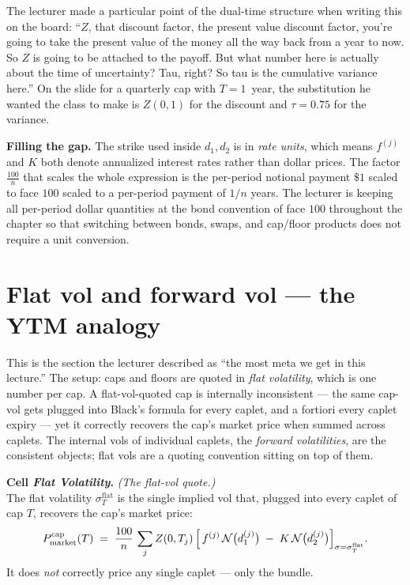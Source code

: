 The lecturer made a particular point of the dual-time structure
when writing this on the board: ``$Z$, that discount factor, the
present value discount factor, you're going to take the present value
of the money all the way back from a year to now. So $Z$ is going to
be attached to the payoff. But what number here is actually about the
time of uncertainty? Tau, right? So tau is the cumulative variance
here.'' On the slide for a quarterly cap with $T = 1$~year, the
substitution he wanted the class to make is $Z(0, 1)$ for the
discount and $\tau = 0.75$ for the variance.

\begin{tipblock}
\textbf{Filling the gap.} The strike used inside $d_1, d_2$ is in
\emph{rate units}, which means $f^{(j)}$ and $K$ both denote
annualized interest rates rather than dollar prices. The factor
$\frac{100}{n}$ that scales the whole expression is the per-period
notional payment $\$1$ scaled to face $100$ scaled to a per-period
payment of $1/n$ years. The lecturer is keeping all per-period dollar
quantities at the bond convention of face $100$ throughout the
chapter so that switching between bonds, swaps, and cap/floor
products does not require a unit conversion.
\end{tipblock}

\section{Flat vol and forward vol --- the YTM analogy}\label{L6-sec:flatvfwd}

This is the section the lecturer described as ``the most meta we get
in this lecture.'' The setup: caps and floors are quoted in
\emph{flat volatility}, which is one number per cap. A
flat-vol-quoted cap is internally inconsistent --- the same cap-vol
gets plugged into Black's formula for every caplet, and a fortiori
every caplet expiry --- yet it correctly recovers the cap's market
price when summed across caplets. The internal vols of individual
caplets, the \emph{forward volatilities}, are the consistent objects;
flat vols are a quoting convention sitting on top of them.

\begin{keyblock}
\textbf{Cell \emph{Flat Volatility}.}
\emph{(The flat-vol quote.)}\\
The flat volatility $\sigma^{\text{flat}}_T$ is the single implied
vol that, plugged into every caplet of cap $T$, recovers the cap's
market price:
\[
  P^{\text{cap}}_{\text{market}}(T)
     \;=\; \frac{100}{n}\,\sum_{j} Z(0, T_j)\,
        \Bigl[\, f^{(j)}\,\mathcal{N}\bigl(d_1^{(j)}\bigr)
                 \;-\; K\,\mathcal{N}\bigl(d_2^{(j)}\bigr) \Bigr]_{\sigma = \sigma^{\text{flat}}_T}.
\]
It does \emph{not} correctly price any single caplet --- only the
bundle.
\end{keyblock}

